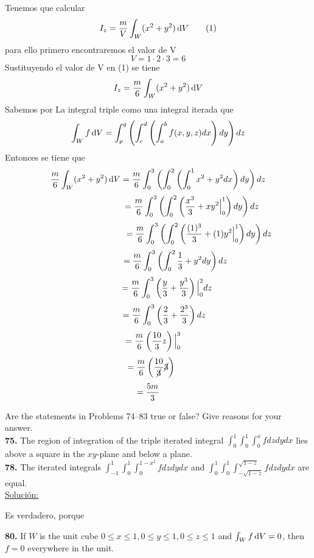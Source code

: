 \documentclass[11pt]{report}
\newcommand{\s}{\underline{Soluci\'{o}n:}}
\begin{document}
Tenemos que calcular
\[I_z = \frac{m}{V} \int _W (x^2 + y^2) \, \text d V \qquad (1) \]
para ello primero encontraremos el valor de V
\[V = 1 \cdot 2 \cdot 3 = 6 \]
Sustituyendo el valor de V en (1) se tiene
\[I_z = \frac{m}{6} \int _W (x^2 + y^2) \, \text d V\]
Sabemos por La integral triple como una integral iterada que
\[\int _W f \, \text d V = \int^{q}_{p}\left(\int^{d}_{c}\left(\int^{b}_{a}f(x,y,z) dx \right)dy \right)dz\]
Entonces se tiene que
\[\frac{m}{6} \int _W (x^2 + y^2) \, \text d V = \frac{m}{6}\int^{3}_{0}\left(\int^{2}_{0}\left(\int^{1}_{0}x^2 + y^2 dx \right)dy \right)dz \]
\[\hspace{2.8cm} = \frac{m}{6}\int^{3}_{0}\left(\int^{2}_{0}\left(\frac{x^3}{3} + xy^2\Big|^{1}_{0}\right)dy \right)dz \]
\[\hspace{3.4cm}  = \frac{m}{6}\int^{3}_{0}\left(\int^{2}_{0}\left(\frac{(1)^3}{3} + (1)y^2\Big|^{1}_{0}\right)dy \right)dz\]
\[\hspace{1.45cm}= \frac{m}{6}\int^{3}_{0}\left(\int^{2}_{0}\frac{1}{3} + y^2 dy \right)dz\]
\[\hspace{0.75cm}= \frac{m}{6}\int^{3}_{0}\left(\frac{y}{3} + \frac{y^3}{3}\right)\Big|^{2}_{0}dz \]
\[\hspace{0.5cm}= \frac{m}{6}\int^{3}_{0}\left(\frac{2}{3} + \frac{2^3}{3}\right)dz \]
\[\hspace{-0.4cm}= \frac{m}{6}\left(\frac{10}{3}z \right)\Big|^{3}_{0}\]
\[\hspace{-0.6cm}= \frac{m}{6}\left(\frac{10}{\cancel{3}}\cancel{3}\right)\]
\[\hspace{-0.8cm}= \frac{5m}{3}\]

Are the statements in Problems 74–83 true or false? Give reasons for your answer. \\

\textbf{75.} The region of integration of the triple iterated integral
$\int_0^1 \int_0^1 \int_0^x f dz dy dx $ lies above a square in the $xy$-plane
and below a plane. \\

\textbf{78.} The iterated integrals $\int_{-1}^1 \int_0^1 \int_0^{1-x^2} f dz dy dx $
and $\int_0^1 \int_0^1 \int_{-\sqrt{1-z}}^{\sqrt{1-z}} f dz dy dx $ are equal. \\

\s

Es verdadero, porque


\textbf{80.} If $W$ is the unit cube $0 \leq x \leq 1, 0 \leq y \leq 1, 0 \leq z \leq 1$
and $ \int _W f \, \text dV = 0$, then $f = 0$ everywhere in the unit. \\
\end{document}
